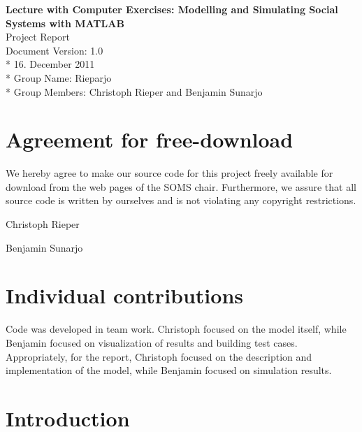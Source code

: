 \documentclass[a4paper, DIV11, abstracton]{scrartcl}
\begin{document}
\thispagestyle{empty}




\textbf{\fontsize{30}{34}\selectfont Lecture with Computer Exercises: Modelling and Simulating Social Systems with {\sc MATLAB}}\\
Project Report\\[2cm]


Document Version: 1.0\\*
16. December 2011\\*
Group Name: Rieparjo\\*
Group Members: Christoph Rieper and Benjamin Sunarjo



\newpage
\setcounter{page}{1}
\section*{Agreement for free-download}

We hereby agree to make our source code for this project freely available for download from the web pages of the SOMS chair. Furthermore, we assure that all source code is written by ourselves and is not violating any copyright restrictions.

\bigskip
Christoph Rieper

\bigskip
Benjamin Sunarjo

\newpage


\tableofcontents

\newpage
\setcounter{page}{1}	%
\pagestyle{plain}

\section*{Individual contributions}
Code was developed in team work. Christoph focused on the model itself, while Benjamin focused on visualization of results and building test cases. Appropriately, for the report, Christoph focused on the description and implementation of the model, while Benjamin focused on simulation results.

\section{Introduction}
\end{document}
